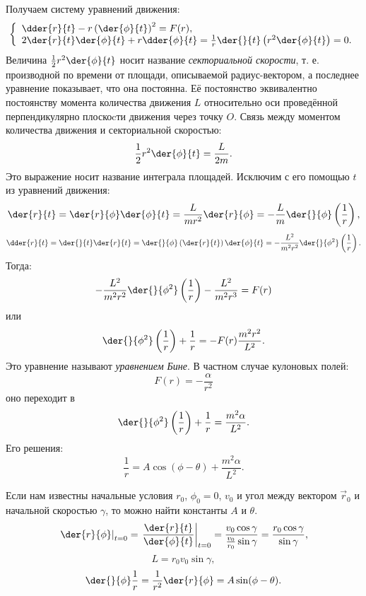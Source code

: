 Получаем систему уравнений движения:
\[
    \left\{
    \begin{array}{l}
        \dder{r}{t} - 
        r
        \left(
        \der{\phi}{t}
        \right)^2 = 
        F(r),
        \\ 
        2\der{r}{t} \der{\phi}{t}+ 
        r \dder{\phi}{t}
        =
        \frac{1}{r}
        \der{}{t}
        \left(
            r^2 \der{\phi}{t}
        \right)
        = 0.
    \end{array}
    \right.
\]
Величина \( \frac{1}{2}r^2 \der{\phi}{t} \) носит название
\textit{секториальной скорости}, т. е. производной по времени от площади,
описываемой радиус-вектором, а последнее уравнение показывает, что она
постоянна. Её постоянство эквивалентно постоянству момента количества движения
\( L \) относительно оси проведённой перпендикулярно плоскоcти движения через
точку \( O \). Связь между моментом количества движения и секториальной
скоростью:
\[
    \frac{1}{2}r^2 \der{\phi}{t} = \frac{L}{2m}.
\]
Это выражение носит название интеграла площадей. Исключим с его помощью \( t \)
из уравнений движения:
\[
    \der{r}{t} = 
    \der{r}{\phi} \der{\phi}{t} =
    \frac{L}{mr^2 } \der{r}{\phi} =
    -\frac{L}{m} \der{}{\phi}\left( \frac{1}{r} \right),
\]   
\[
    \dder{r}{t} = 
    \der{}{t}\der{r}{t}  =
    \der{}{\phi}\left(\der{r}{t}\right)\der{\phi}{t} =
    -\frac{L^2}{m^2 r^2 } \der{}{\phi^2}\left( \frac{1}{r} \right).
\]     
Тогда:
\[
    -\frac{L^2}{m^2 r^2 } \der{}{\phi^2}\left( \frac{1}{r} \right) -
    \frac{L^2}{m^2 r^3} = 
    F(r)
\]   
или
\[
    \der{}{\phi^2}\left( \frac{1}{r} \right) +
    \frac{1}{r} = 
    - F(r)\frac{m^2 r^2}{ L^2}.
\]   
Это уравнение называют \textit{уравнением Бине}. В частном случае кулоновых
полей:
\[
    F(r) = -\frac{\alpha}{r^2}
\]   
оно переходит в
\[
    \der{}{\phi^2}\left( \frac{1}{r} \right) +
        \frac{1}{r} = 
        \frac{m^2 \alpha}{ L^2}.
\]     
Его решения:
\[
    \frac{1}{r} = A \cos (\phi - \theta) + \frac{m^2 \alpha}{ L^2}.
\]   
    
Если нам известны начальные условия \( r_0 \), \( \phi_0 = 0 \), \( v_0 \)
и угол между вектором \( \vec{r}_{0} \) и начальной скоростью \( \gamma \), то
можно найти константы \( A \) и \( \theta \).
\[
    \left.\der{r}{\phi}\right|_{t=0} = 
    \left.\frac{\der{r}{t}}{\der{\phi}{t}}\right|_{t=0} =
    \frac{ v_0 \cos \gamma}{\frac{v_0}{r_0}  \sin \gamma} =
    \frac{ r_0 \cos \gamma}{ \sin \gamma},
\]
\[   
    L = r_0 v_0 \sin \gamma,
\]
\[   
    \der{}{\phi}\frac{1}{r} = \frac{1}{r^2} \der{r}{\phi} =
    A \sin (\phi - \theta).
\]
    
